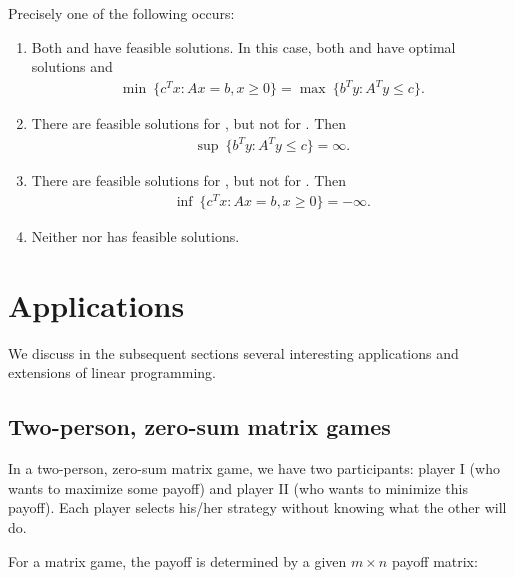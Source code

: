 \begin{theorem}
Precisely one of the following occurs:
\begin{enumerate}
    \item Both  and  have feasible solutions.
    In this case, both  and  have optimal solutions and
    \begin{align}
    \min \ \{ c^T x : Ax = b, x \ge 0 \} = \max \ \{ b^T y : A^T y \le c \}.
    \end{align}
    \item There are feasible solutions for , but not for . 
    Then
    \begin{align}
    \sup \ \{ b^T y : A^T y \le c \} = \infty.    
    \end{align}
    \item There are feasible solutions for , but not for . 
    Then 
    \begin{align}
    \inf \ \{ c^T x : Ax = b, x \ge 0 \} = -\infty.
    \end{align}
    \item Neither  nor  has feasible solutions.
\end{enumerate}
\end{theorem}


\section{Applications}

We discuss in the subsequent sections several interesting applications and extensions of linear programming.

\subsection{Two-person, zero-sum matrix games}

In a two-person, zero-sum matrix game, we have two participants: player I (who wants to maximize some payoff) and player II (who wants to minimize this payoff). 
Each player selects his/her strategy without knowing what the
other will do.

For a matrix game, the payoff is determined by a given $m \times n$ payoff matrix:

